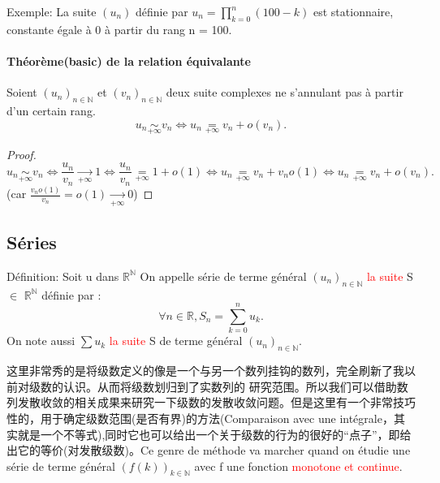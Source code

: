 \documentclass[12pt]{book}
\theoremstyle{definition}\newtheorem{dfn}{Définition}[chapter]
\theoremstyle{plain}\newtheorem{thm}{Théorème}[chapter]
\theoremstyle{plain}\newtheorem{prp}{Proposition}[chapter]
\theoremstyle{plain}\newtheorem{lem}{\bf Lemme}[chapter]
\theoremstyle{plain}\newtheorem{axm}{\bf Axiome}[chapter]
\theoremstyle{plain}\newtheorem{lmm}{\bf Lemme}[chapter]
\theoremstyle{plain}\newtheorem{cor}{\bf Corollaire}[chapter]
\theoremstyle{remark}\newtheorem{rem}{Remarque}[chapter]
\begin{document}
        Exemple: La suite $(u_n)$ déﬁnie par $u_n = \prod _{k=0}^n(100-k)$ est stationnaire, constante égale à 0 à partir du rang n = 100.

\paragraph{Théorème(basic) de la relation équivalante}
Soient $(u_n)_{n\in \mathbb{N}}$ et  $(v_n)_{n\in \mathbb{N}}$  deux suite complexes ne s'annulant pas à partir d'un certain rang.
$$u_n\underset{+\infty}{\sim} v_n \Longleftrightarrow  u_n \underset{+\infty}{=} v_n + o(v_n).$$
\begin{proof}
        $$u_n\underset{+\infty}{\sim} v_n \Longleftrightarrow  \frac{u_n}{v_n}\xrightarrow[+\infty]{} 1 \Longleftrightarrow  \frac{u_n}{v_n}
\underset{+\infty}{=} 1+o(1)
\Longleftrightarrow  u_n
\underset{+\infty}{=} v_n+v_no(1)
\Longleftrightarrow u_n \underset{+\infty}{=} v_n + o(v_n).$$
(car $\frac{v_no(1)}{v_n}=o(1)\xrightarrow[+\infty]{} 0$)


\end{proof}






        \subsection{Séries}
Définition: Soit u dans	$\mathbb{R}^\mathbb{N}$
On appelle série de terme général $ (u_n)_{n\in\mathbb{N}}$ \textcolor{red}{la suite} S $\in$ $\mathbb{R}^\mathbb{N}$ définie par :
\begin{equation*}
\forall n \in \mathbb{R} , S_n = \sum_{k=0}^{n}u_k.
\end{equation*}
On note aussi $\sum u_k$ \textcolor{red}{la suite} S de terme général $ (u_n)_{n\in\mathbb{N}}$.


这里非常秀的是将级数定义的像是一个与另一个数列挂钩的数列，完全刷新了我以前对级数的认识。从而将级数划归到了实数列的
研究范围。所以我们可以借助数列发散收敛的相关成果来研究一下级数的发散收敛问题。但是这里有一个非常技巧性的，用于确定级数范围(是否有界)的方法(Comparaison avec une intégrale，其实就是一个不等式),同时它也可以给出一个关于级数的行为的很好的“点子”，即给出它的等价(对发散级数)。Ce genre de méthode va marcher quand on étudie une série de terme général $(f(k))_{k\in \mathbb{N}}$ avec f une fonction \textcolor{red}{monotone et continue}.
\end{document}
